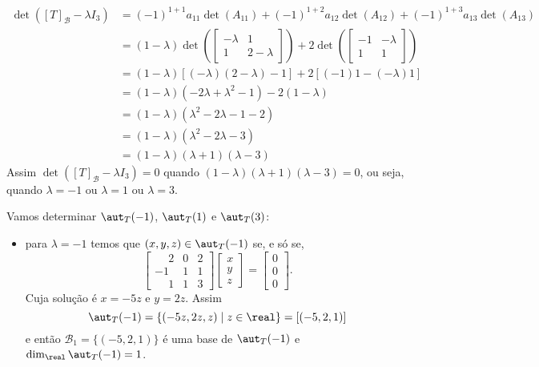\begin{exemplo}
\begin{enumerate}[label={\arabic*})]
\begin{solucao}
\begin{align*}
                    \det([T]_\mathcal{B} - \lambda I_3) &= (-1)^{1 + 1}a_{11}\det(A_{11}) + (-1)^{1 + 2}a_{12}\det(A_{12}) + (-1)^{1 + 3}a_{13}\det(A_{13}) \\ &= (1 - \lambda)\det\left(\begin{bmatrix}-\lambda & 1\\1 & 2 - \lambda\end{bmatrix}\right) + 2\det\left(\begin{bmatrix}-1 & -\lambda\\1 & 1\end{bmatrix}\right) \\ &= (1 - \lambda)[(-\lambda)(2 - \lambda) - 1] + 2[(-1)1 - (-\lambda)1] \\ &= (1 - \lambda)(-2\lambda + \lambda^2 - 1) - 2(1 - \lambda) \\ &= (1 - \lambda)(\lambda^2 - 2\lambda - 1 - 2) \\ &= ( 1 -\lambda)(\lambda^2 - 2\lambda - 3) \\ &= (1 - \lambda)(\lambda + 1)(\lambda - 3)
                \end{align*}
                Assim $\det([T]_\mathcal{B} - \lambda I_3) = 0$ quando $(1 - \lambda)(\lambda + 1)(\lambda - 3) = 0$, ou seja, quando $\lambda = -1$ ou $\lambda = 1$ ou $\lambda = 3$.

                Vamos determinar $\aut_T(-1)$, $\aut_T(1)$ e $\aut_T(3)$:
                \begin{itemize}
                    \item para $\lambda = -1$ temos que $(x,y,z) \in \aut_T(-1)$ se, e s\'o se,
                        \[
                            \begin{bmatrix}
                                \phantom{-}2 & 0 & 2\\
                                -1 & 1 & 1\\
                                \phantom{-}1 & 1 & 3
                            \end{bmatrix}\begin{bmatrix}
                                x\\y\\z
                            \end{bmatrix} = \begin{bmatrix}
                                0\\0\\0
                            \end{bmatrix}.
                        \]
                        Cuja solução é $x = -5z$ e $y = 2z$. Assim
                        \[
                            \aut_T(-1) = \{(-5z,2z,z) \mid z \in \real\} = [(-5,2,1)]
                        \]
                        e então $\mathcal{B}_1 = \{(-5,2,1)\}$ é uma base de $\aut_T(-1)$ e $\dim_\real\aut_T(-1) = 1$.


\end{itemize}
\end{solucao}
\end{enumerate}
\end{exemplo}
